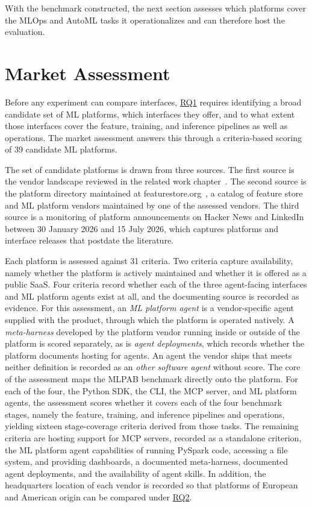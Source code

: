 \documentclass[
english,                 %
bibtex,                  %
]{kththesis}
\numberwithin{listing}{chapter}
\begin{document}
With the benchmark constructed, the next section assesses which platforms cover the \gls{MLOps} and \gls{AutoML} tasks it operationalizes and can therefore host the evaluation.

\section{Market Assessment}
\label{sec:method_market_assessment}
\glsresetall

Before any experiment can compare interfaces, \hyperref[rq1]{RQ1} requires identifying a broad candidate set of \gls{ML} platforms, which interfaces they offer, and to what extent those interfaces cover the feature, training, and inference pipelines as well as operations. The market assessment answers this through a criteria-based scoring of 39 candidate \gls{ML} platforms.

The set of candidate platforms is drawn from three sources. The first source is the vendor landscape reviewed in the related work chapter~\cite{jaffri_magic_2025}. The second source is the platform directory maintained at featurestore.org~\cite{hopsworks_ab_feature_2025}, a catalog of feature store and \gls{ML} platform vendors maintained by one of the assessed vendors. The third source is a monitoring of platform announcements on Hacker News and LinkedIn between 30 January 2026 and 15 July 2026, which captures platforms and interface releases that postdate the literature.

Each platform is assessed against 31 criteria. Two criteria capture availability, namely whether the platform is actively maintained and whether it is offered as a public \gls{SaaS}. Four criteria record whether each of the three agent-facing interfaces and \gls{ML} platform agents exist at all, and the documenting source is recorded as evidence. For this assessment, an \emph{\gls{ML} platform agent} is a vendor-specific agent supplied with the product, through which the platform is operated natively. A \emph{meta-harness} developed by the platform vendor running inside or outside of the platform is scored separately, as is \emph{agent deployments}, which records whether the platform documents hosting for agents. An agent the vendor ships that meets neither definition is recorded as an \emph{other software agent} without score. The core of the assessment maps the \gls{MLPAB} benchmark directly onto the platform. For each of the four, the Python \gls{SDK}, the \gls{CLI}, the \gls{MCP} server, and \gls{ML} platform agents, the assessment scores whether it covers each of the four benchmark stages, namely the feature, training, and inference pipelines and operations, yielding sixteen stage-coverage criteria derived from those tasks. The remaining criteria are hosting support for \gls{MCP} servers, recorded as a standalone criterion, the \gls{ML} platform agent capabilities of running PySpark code, accessing a file system, and providing dashboards, a documented meta-harness, documented agent deployments, and the availability of agent skills. In addition, the headquarters location of each vendor is recorded so that platforms of European and American origin can be compared under \hyperref[rq2]{RQ2}.
\end{document}
